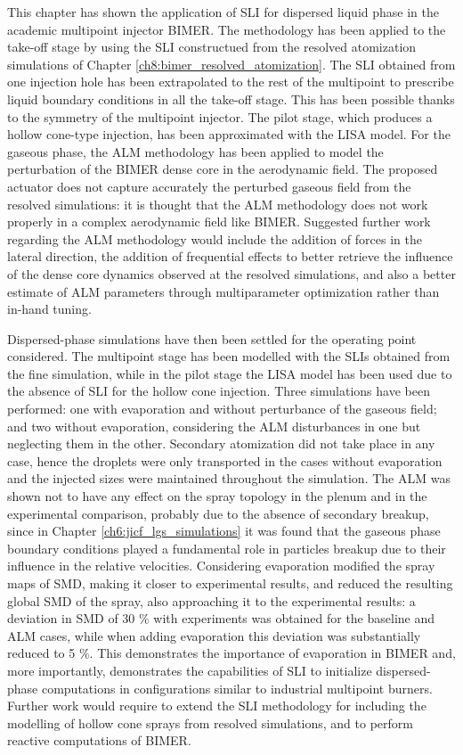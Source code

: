 This chapter has shown the application of SLI for dispersed liquid phase in the academic multipoint injector BIMER. The methodology has been applied to the take-off stage by using the SLI constructued from the resolved atomization simulations of Chapter \ref{ch8:bimer_resolved_atomization}. The SLI obtained from one injection hole has been extrapolated to the rest of the multipoint to prescribe liquid boundary conditions in all the take-off stage. This has been possible thanks to the symmetry of the multipoint injector. The pilot stage, which produces a hollow cone-type injection, has been approximated with the LISA 
model. For the gaseous phase, the ALM methodology has been applied to model the perturbation of the BIMER dense core in the aerodynamic field. The proposed actuator does not capture accurately the perturbed gaseous field from the resolved simulations: it is thought that the ALM methodology does not work properly in a complex aerodynamic field like BIMER. Suggested further work regarding the ALM methodology would include the addition of forces in the lateral direction, the addition of frequential effects to better retrieve the influence of the dense core dynamics observed at the resolved simulations, and also a better estimate of ALM parameters through multiparameter optimization rather than in-hand tuning.

Dispersed-phase simulations have then been settled for the operating point considered. The multipoint stage has been modelled with the SLIs obtained from the fine simulation, while in the pilot stage the LISA model has been used due to the absence of SLI for the hollow cone injection. Three simulations have been performed: one with evaporation and without perturbance of the gaseous field; and two without evaporation, considering the ALM disturbances in one but neglecting them in the other. Secondary atomization did not take place in any case, hence the droplets were only transported in the cases without evaporation and the injected sizes were maintained throughout the simulation. The ALM was shown not to have any effect on the spray topology in the plenum and in the experimental comparison, probably due to the absence of secondary breakup, since in Chapter \ref{ch6:jicf_lgs_simulations} it was found that the gaseous phase boundary conditions played a fundamental role in particles breakup due to their influence in the relative velocities. Considering evaporation modified the spray maps of SMD, making it closer to experimental results, and reduced the resulting global SMD of the spray, also approaching it to the experimental results: a deviation in SMD of 30 $\%$ with experiments was obtained for the baseline and ALM cases, while when adding evaporation this deviation was substantially reduced to 5 $\%$. This demonstrates the importance of evaporation in BIMER and, more importantly, demonstrates the capabilities of SLI to initialize dispersed-phase computations in configurations similar to industrial multipoint burners. Further work would require to extend the SLI methodology for including the modelling of hollow cone sprays from resolved simulations, and to perform reactive computations of BIMER.




